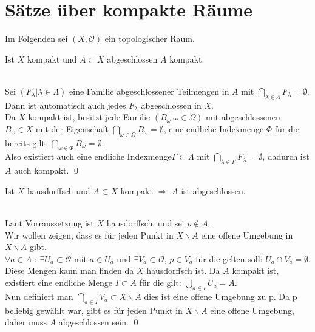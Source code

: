\chapter{Sätze über kompakte Räume}
Im Folgenden sei \((X,\mathcal{O})\) ein topologischer Raum.
	\begin{Satz}
		Ist \(X\) kompakt und \(A \subset X\) abgeschlossen \Rightarrow \(A\) kompakt.
	\end{Satz}
	
 
	\beweis{Beweis} 
		\\
		Sei \((F_{\lambda} | \lambda \in \Lambda) \) eine Familie abgeschlossener Teilmengen in \(A\) mit \( \bigcap_{\lambda \in \Lambda } F_{\lambda} = \emptyset \).\\
		Dann ist automatisch auch jedes \(F_{\lambda} \) abgeschlossen in \(X\).\\
		Da \(X\) kompakt ist, besitzt jede Familie \((B_{\omega} | \omega \in \Omega) \) mit abgeschlossenen 
		\(B_{\omega} \in X \) mit der Eigenschaft \( \bigcap_{\omega \in \Omega} B_{\omega} = \emptyset\), eine 
		endliche Indexmenge \(\Phi\) für die bereits gilt: \( \bigcap_{\omega \in \Phi} B_{\omega} = \emptyset\).\\
		Also existiert auch eine endliche Indexmenge\( \Gamma \subset \Lambda \) mit \( \bigcap_{\lambda \in \Gamma } F_{\lambda} = \emptyset \), dadurch ist 
		\(A\) auch kompakt.
		\qed
		
		
	\begin{Satz}
		Ist \(X\) hausdorffsch und \(A \subset X \) kompakt \( \Rightarrow \) \(A\) ist abgeschlossen.
	\end{Satz}
	
	
		\\
		Laut Vorraussetzung ist \(X\) hausdorffsch, und sei \(p \notin A \). \\
		Wir wollen zeigen, dass es für jeden Punkt in \(X \backslash A \) eine offene Umgebung in \(X \backslash A \) gibt.\\
		\( \forall a \in A\) : \(\exists U_{a}\subset \mathcal{O} \) mit \(  a \in U_{a}\) und \(\exists V_{a}\subset \mathcal{O} \), \(  p \in V_{a}\) für die gelten soll:
		 \(U_{a} \cap V_{a} = \emptyset \). Diese Mengen kann man finden da \(X\) hausdorffsch ist. Da \(A\) kompakt ist, existiert eine endliche Menge \(I \subset A\) für die gilt:
		\( \bigcup_{a \in I} U_{a} = A \). \\
		Nun definiert man \(\bigcap_{a \in I} V_{a} \subset X\backslash A \) dies ist eine offene Umgebung zu p. Da p beliebig gewählt war, gibt es 
		für jeden Punkt in \(X\backslash A \) eine offene Umgebung, daher muss \(A\) abgeschlossen sein. \qed
		
